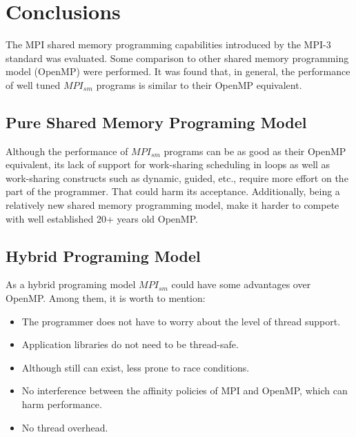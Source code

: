 \section{Conclusions} 

The MPI shared memory programming capabilities introduced by the MPI-3 standard was evaluated. Some comparison to other shared memory programming model (OpenMP) were performed. It was found that, in general, the performance of well tuned $MPI_{sm}$ programs is similar to their OpenMP equivalent.



\subsection*{Pure Shared Memory Programing Model}

Although the performance of $MPI_{sm}$ programs can be as good as their OpenMP equivalent, its lack of support for work-sharing scheduling in loops as well as work-sharing constructs such as dynamic, guided, etc., require more effort on the part of the programmer. That could harm its acceptance. Additionally, being a relatively new shared memory programming model, make it harder to compete with well established 20+ years old OpenMP.


\subsection*{Hybrid Programing Model}

As a hybrid programing model $MPI_{sm}$ could have some advantages over OpenMP. Among them, it is worth to mention:

\begin{itemize} 
  \item The programmer does not have to worry about the level of thread support.
  \item Application libraries do not need to be thread-safe.
  \item Although still can exist, less prone to race conditions.
  \item No interference between the affinity policies of MPI and OpenMP, which can harm performance.  
  \item No thread overhead.
\end{itemize}



